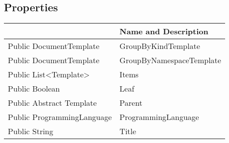 \documentclass[11pt, oneside, a4paper]{book}
\begin{document}
\subsection{Properties}
\begin{center}
\begin{tabular}{| p{3cm} | p{12cm} | }
\hline
\textbf{ } & \textbf{ Name and Description}\\
\hline
 Public  DocumentTemplate &  GroupByKindTemplate\hypertarget{SoftwareEngineeringTools.{}Documentation.{}DocumentTemplate.{}GroupByKindTemplate}{}\\
\hline
 Public  DocumentTemplate &  GroupByNamespaceTemplate\hypertarget{SoftwareEngineeringTools.{}Documentation.{}DocumentTemplate.{}GroupByNamespaceTemplate}{}\\
\hline
 Public  List<Template> &  Items\hypertarget{SoftwareEngineeringTools.{}Documentation.{}DocumentTemplate.{}Items}{}\\
\hline
 Public  Boolean &  Leaf\hypertarget{SoftwareEngineeringTools.{}Documentation.{}DocumentTemplate.{}Leaf}{}\\
\hline
 Public  Abstract  Template &  Parent\hypertarget{SoftwareEngineeringTools.{}Documentation.{}DocumentTemplate.{}Parent}{}\\
\hline
 Public  ProgrammingLanguage &  ProgrammingLanguage\hypertarget{SoftwareEngineeringTools.{}Documentation.{}DocumentTemplate.{}ProgrammingLanguage}{}\\
\hline
 Public  String &  Title\hypertarget{SoftwareEngineeringTools.{}Documentation.{}DocumentTemplate.{}Title}{}\\
\hline
\end{tabular}
\end{center}
\end{document}
